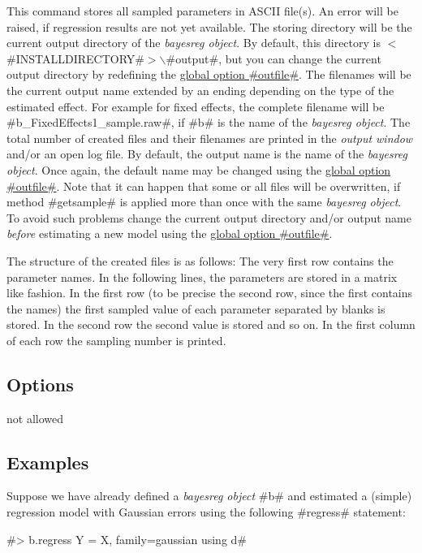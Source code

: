 This command stores all sampled parameters in ASCII file(s). An
error will be raised, if regression results are not yet available.
The storing directory will be the current output directory of the
{\em bayesreg object}. By default, this directory is
$<$#INSTALLDIRECTORY#$>$$\backslash$#output#, but you can change
the current output directory by redefining the
\hyperref[bayesregglobopt]{global option #outfile#}. The filenames
will be the current output name extended by an ending depending on
the type of the estimated effect. For example for fixed effects,
the complete filename will be #b_FixedEffects1_sample.raw#, if
#b# is the name of the {\em bayesreg object}. The total number of
created files and their filenames are printed in the {\em output
window} and/or an open log file. By default, the output name is
the name of the {\em bayesreg object}. Once again, the default
name may be changed using the \hyperref[bayesregglobopt]{global
option #outfile#}. Note that it can happen that some or all files
will be overwritten, if method #getsample# is applied more than
once with the same {\em bayesreg object}. To avoid such problems
change the current output directory and/or output name {\em
before} estimating a new model using the
\hyperref[bayesregglobopt]{global option #outfile#}.

The structure of the created files is as follows: The very first
row contains the parameter names. In the following lines, the
parameters are stored in a matrix like fashion. In the first row
(to be precise the second row, since the first contains the names)
the first sampled value of each parameter separated by blanks is
stored. In the second row the second value is stored and so on. In
the first column of each row the sampling number is printed.


\subsection*{Options}

not allowed

\subsection*{Examples}

Suppose we have already defined a {\em bayesreg object} #b# and
estimated a (simple) regression model with Gaussian errors using
the following #regress# statement:

#> b.regress Y = X, family=gaussian using d#

